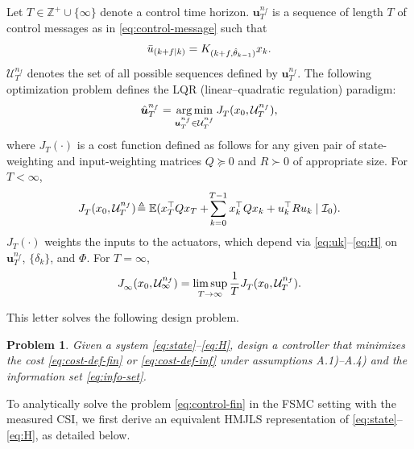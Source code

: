 \documentclass[journal,twoside,web]{ieeecolor}
\newtheorem{problem}{Problem}
\begin{document}
Let $T\in\mathbb{Z}^{+} \cup \{\infty\}$ denote a control time horizon. $\bm{u}_{T}^{n_f}$ is a sequence of length $T$ of control messages as in \eqref{eq:control-message} such that
\begin{equation}\label{eq:control-element}
    \text{\small $\bar{u}_{(k+f\mid k)} = K_{(k+f,\hat{\theta}_{k-1})}x_k.$}
\end{equation}
$\mathcal{U}_{T}^{n_f}$ denotes the set of all possible sequences defined by $\bm{u}_{T}^{n_f}$.
The following optimization problem defines
the LQR (linear–quadratic regulation) paradigm:
\begin{equation}\label{eq:control-fin}
    \text{\small $\hat{\bm{u}}_{T}^{n_f} = \mathop{\mathrm{arg\,min}}_{\bm{u}_{T}^{n_f} \in \mathcal{U}_{T}^{n_f}} J_{T}^{}(x_0,\mathcal{U}_{T}^{n_f}),$}
\end{equation}
where $J_{T}^{}(\cdot)$ is a cost function defined as follows for any given pair of state-weighting and input-weighting matrices $Q\succeq 0$ and $R \succ 0$ of appropriate size.
For $T<\infty$,
\begin{equation}\label{eq:cost-def-fin}
    \text{\small $J_{T}^{}(x_0,\mathcal{U}_{T}^{n_f}) \!\triangleq \mathbb{E}(x_T^{\top} Q x_T +\! \sum_{k=0}^{T-1} x_k^{\top} Q x_k + u_k^{\top}Ru_k \mid \mathcal{I}_0).$}
\end{equation}
$J_{T}^{}(\cdot)$ weights the inputs to the actuators, which depend via \eqref{eq:uk}–\eqref{eq:H} on $\bm{u}_{T}^{n_f}$, $\{\delta_k\}$, and $\mathit{\Phi}$. For $T=\infty$, 
\begin{equation}\label{eq:cost-def-inf}
    \text{\small $J_{\infty}^{}(x_0,\mathcal{U}_{\infty}^{n_f}) = \limsup_{T\to\infty} \frac{1}{T} J_{T}^{}(x_0,\mathcal{U}_{T}^{n_f}).$}
\end{equation}

This letter solves the following design problem.

\begin{problem}\label{problem:lqr}
   Given a system \eqref{eq:state}–\eqref{eq:H}, design a controller that minimizes the cost \eqref{eq:cost-def-fin} or \eqref{eq:cost-def-inf} under assumptions A.1)–A.4) and the information set \eqref{eq:info-set}.
\end{problem}

To analytically solve the problem \eqref{eq:control-fin} in the FSMC setting with the measured CSI, we first derive an equivalent HMJLS representation of \eqref{eq:state}–\eqref{eq:H}, as detailed below. 
\end{document}
